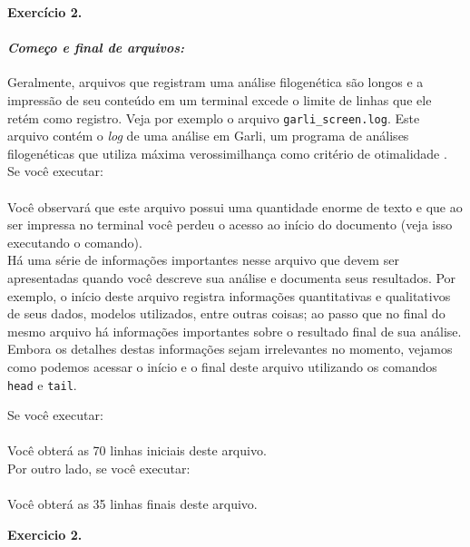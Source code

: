 \begin{refsection}
\begin{blackBlock}{\textbf{Exercício 2.}}
\end{blackBlock}


\paragraph{\textit{Começo e final de arquivos:}}\label{tut2:text:editors:texttools:headtail}
Geralmente, arquivos que registram uma análise filogenética são longos e a impressão de seu conteúdo em um terminal excede o limite de linhas que ele retém como registro. Veja por exemplo o arquivo \texttt{garli\_screen.log}. Este arquivo contém o \textit{log} de uma análise em Garli, um programa de análises filogenéticas que utiliza máxima verossimilhança como critério de otimalidade \parencite{Zwickl_2006}.\\

Se você executar:\\
\\

Você observará que este arquivo possui uma quantidade enorme de texto e que ao ser impressa no terminal você perdeu o acesso ao início do documento (veja isso executando o comando).\\
Há uma série de informações importantes nesse arquivo que devem ser apresentadas quando você descreve sua análise e documenta seus resultados. Por exemplo, o início deste arquivo registra informações quantitativas e qualitativos de seus dados, modelos utilizados, entre outras coisas; ao passo que no final do mesmo arquivo há informações importantes sobre o resultado final de sua análise. Embora os detalhes destas informações sejam irrelevantes no momento, vejamos como podemos acessar o início e o final deste arquivo utilizando os comandos \texttt{head} e \texttt{tail}.

Se você executar:\\
\\

Você obterá as 70 linhas iniciais deste arquivo.\\

Por outro lado, se você executar:\\
\\

Você obterá as 35 linhas finais deste arquivo.\\

\begin{blackBlock}{\textbf{Exercicio 2.}}\label{tut2:ex:2.\arabic{ex}}


\end{blackBlock}
\end{refsection}
